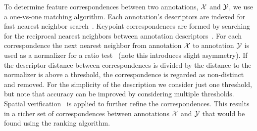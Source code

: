 To determine feature correspondences between two annotations, $\mathcal{X}$ and $\mathcal{Y}$, we use a one-vs-one matching
  algorithm.
Each annotation's descriptors are indexed for fast nearest neighbor search~\cite{muja_fast_2009}.
Keypoint correspondences are formed by searching for the reciprocal nearest neighbors between annotation
  descriptors~\cite{qin_hello_2011}.
For each correspondence the next nearest neighbor from annotation $\mathcal{X}$ to annotation $\mathcal{Y}$ is used as a
  normalizer for a ratio test~\cite{lowe_distinctive_2004} (note this introduces slight asymmetry).
If the descriptor distance between correspondences is divided by the distance to the normalizer is above a
  threshold, the correspondence is regarded as non-distinct and removed.
For the simplicity of the description we consider just one threshold, but note that accuracy can be improved by
  considering multiple thresholds.
Spatial verification~\cite{philbin_object_2007} is applied to further refine the correspondences.
This results in a richer set of correspondences between annotations $\mathcal{X}$ and $\mathcal{Y}$ that would be found using
  the ranking algorithm.


